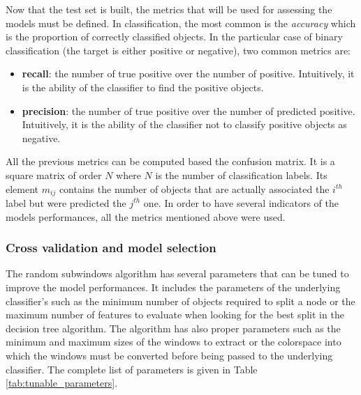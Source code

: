 Now that the test set is built, the metrics that will be used for assessing the models must be defined. In classification, the most common is the \textit{accuracy} which is the proportion of correctly classified objects. In the particular case of binary classification (the target is either positive or negative), two common metrics are:

\begin{itemize}
	\item \textbf{recall}: the number of true positive over the number of positive. Intuitively, it is the ability of the classifier to find the positive objects. 
	\item \textbf{precision}: the number of true positive over the number of predicted positive. Intuitively, it is the ability of the classifier not to classify positive objects as negative.
\end{itemize}

All the previous metrics can be computed based the confusion matrix. It is a square matrix of order $N$ where $N$ is the number of classification labels. Its element $m_{ij}$ contains the number of objects that are actually associated the $i^{th}$ label but were predicted the $j^{th}$ one. In order to have several indicators of the models performances, all the metrics mentioned above were used. 

\subsubsection{Cross validation and model selection}
\label{sssec:thyroid_cv}
The random subwindows algorithm has several parameters that can be tuned to improve the model performances. It includes the parameters of the underlying classifier's such as the minimum number of objects required to split a node or the maximum number of features to evaluate when looking for the best split in the decision tree algorithm. The algorithm has also proper parameters such as the minimum and maximum sizes of the windows to extract or the colorspace into which the windows must be converted before being passed to the underlying classifier. The complete list of parameters is given in Table \ref{tab:tunable_parameters}. 


